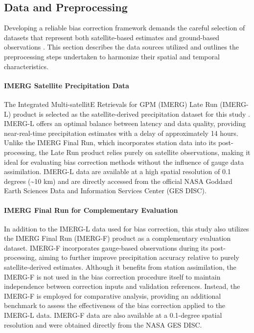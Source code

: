 \documentclass[remotesensing,article,submit,pdftex,moreauthors]{Definitions/mdpi}
\begin{document}
\subsection{Data and Preprocessing}\label{data-and-preprocessing}

Developing a reliable bias correction framework demands the careful
selection of datasets that represent both satellite-based estimates and
ground-based observations \cite{ref22}. This section describes the data
sources utilized and outlines the preprocessing steps undertaken to
harmonize their spatial and temporal characteristics.

\paragraph{IMERG Satellite Precipitation
Data}\label{imerg-satellite-precipitation-data}

The Integrated Multi-satellitE Retrievals for GPM (IMERG) Late Run
(IMERG-L) product is selected as the satellite-derived precipitation
dataset for this study \cite{ref2,ref21}. IMERG-L offers an optimal balance
between latency and data quality, providing near-real-time precipitation
estimates with a delay of approximately 14 hours. Unlike the IMERG Final
Run, which incorporates station data into its post-processing, the Late
Run product relies purely on satellite observations, making it ideal for
evaluating bias correction methods without the influence of gauge data
assimilation. IMERG-L data are available at a high spatial resolution of
0.1 degrees (\textasciitilde10 km) and are directly accessed from the
official NASA Goddard Earth Sciences Data and Information Services
Center (GES DISC).

\paragraph{IMERG Final Run for Complementary
Evaluation}

In addition to the IMERG-L data used for bias correction, this study
also utilizes the IMERG Final Run (IMERG-F) product as a complementary
evaluation dataset. IMERG-F incorporates gauge-based observations during
its post-processing, aiming to further improve precipitation accuracy
relative to purely satellite-derived estimates. Although it benefits
from station assimilation, the IMERG-F is not used in the bias
correction procedure itself to maintain independence between correction
inputs and validation references. Instead, the IMERG-F is employed for
comparative analysis, providing an additional benchmark to assess the
effectiveness of the bias correction applied to the IMERG-L data.
IMERG-F data are also available at a 0.1-degree spatial resolution and
were obtained directly from the NASA GES DISC.
\end{document}

